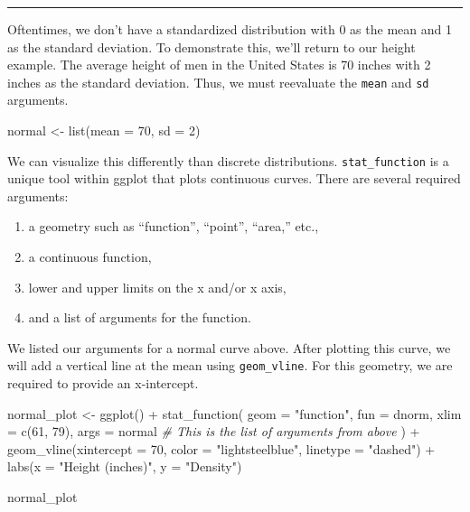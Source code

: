 \documentclass[
]{book}
\newenvironment{Shaded}{\begin{snugshade}}{\end{snugshade}}
\newcommand{\AttributeTok}[1]{\textcolor[rgb]{0.77,0.63,0.00}{#1}}
\newcommand{\CommentTok}[1]{\textcolor[rgb]{0.56,0.35,0.01}{\textit{#1}}}
\newcommand{\DecValTok}[1]{\textcolor[rgb]{0.00,0.00,0.81}{#1}}
\newcommand{\FunctionTok}[1]{\textcolor[rgb]{0.00,0.00,0.00}{#1}}
\newcommand{\NormalTok}[1]{#1}
\newcommand{\OtherTok}[1]{\textcolor[rgb]{0.56,0.35,0.01}{#1}}
\newcommand{\SpecialCharTok}[1]{\textcolor[rgb]{0.00,0.00,0.00}{#1}}
\newcommand{\StringTok}[1]{\textcolor[rgb]{0.31,0.60,0.02}{#1}}
\providecommand{\tightlist}{%
  \setlength{\itemsep}{0pt}\setlength{\parskip}{0pt}}
\begin{document}
\begin{center}\rule{0.5\linewidth}{0.5pt}\end{center}

Oftentimes, we don't have a standardized distribution with 0 as the mean and 1 as the standard deviation. To demonstrate this, we'll return to our height example. The average height of men in the United States is 70 inches with 2 inches as the standard deviation. Thus, we must reevaluate the \texttt{mean} and \texttt{sd} arguments.

\begin{Shaded}
\begin{Highlighting}[]
\NormalTok{normal }\OtherTok{\textless{}{-}} \FunctionTok{list}\NormalTok{(}\AttributeTok{mean =} \DecValTok{70}\NormalTok{, }\AttributeTok{sd =} \DecValTok{2}\NormalTok{)}
\end{Highlighting}
\end{Shaded}

We can visualize this differently than discrete distributions. \texttt{stat\_function} is a unique tool within ggplot that plots continuous curves. There are several required arguments:

\begin{enumerate}
\def\labelenumi{\arabic{enumi}.}
\tightlist
\item
  a geometry such as ``function'', ``point'', ``area,'' etc.,
\item
  a continuous function,
\item
  lower and upper limits on the x and/or x axis,
\item
  and a list of arguments for the function.
\end{enumerate}

We listed our arguments for a normal curve above. After plotting this curve, we will add a vertical line at the mean using \texttt{geom\_vline}. For this geometry, we are required to provide an x-intercept.

\begin{Shaded}
\begin{Highlighting}[]
\NormalTok{normal\_plot }\OtherTok{\textless{}{-}} \FunctionTok{ggplot}\NormalTok{() }\SpecialCharTok{+}
  \FunctionTok{stat\_function}\NormalTok{(}
    \AttributeTok{geom =} \StringTok{"function"}\NormalTok{,}
    \AttributeTok{fun =}\NormalTok{ dnorm,}
    \AttributeTok{xlim =} \FunctionTok{c}\NormalTok{(}\DecValTok{61}\NormalTok{, }\DecValTok{79}\NormalTok{),}
    \AttributeTok{args =}\NormalTok{ normal }\CommentTok{\# This is the list of arguments from above}
\NormalTok{  ) }\SpecialCharTok{+}
  \FunctionTok{geom\_vline}\NormalTok{(}\AttributeTok{xintercept =} \DecValTok{70}\NormalTok{, }\AttributeTok{color =} \StringTok{"lightsteelblue"}\NormalTok{, }\AttributeTok{linetype =} \StringTok{"dashed"}\NormalTok{) }\SpecialCharTok{+}
  \FunctionTok{labs}\NormalTok{(}\AttributeTok{x =} \StringTok{"Height (inches)"}\NormalTok{, }\AttributeTok{y =} \StringTok{"Density"}\NormalTok{)}

\NormalTok{normal\_plot}
\end{Highlighting}
\end{Shaded}
\end{document}
